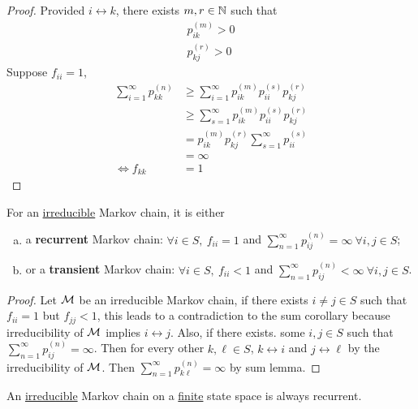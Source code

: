 \documentclass{article}
\newcommand{\upn}[0]{^{(n)}}
\begin{document}
    \begin{proof}
    	Provided $i \leftrightarrow k$, there exists $m, r \in \mathbb{N}$ such that 
    	\begin{align}
    		p_{ik}^{(m)} > 0 \\
    		p_{kj}^{(r)} > 0
    	\end{align}
    	Suppose $f_{ii} = 1$, 
    	\begin{align}
    		\sum_{i=1}^\infty p_{kk}\upn 
    		&\geq \sum_{i=1}^\infty p_{ik}^{(m)} p_{ii}^{(s)} p_{kj}^{(r)} \\
    		&\geq \sum_{s=1}^\infty p_{ik}^{(m)} p_{ii}^{(s)} p_{kj}^{(r)} \\
    		&= p_{ik}^{(m)} p_{kj}^{(r)} \sum_{s=1}^\infty p_{ii}^{(s)} \\
    		&= \infty \\
    		\iff f_{kk} &= 1
    	\end{align}
    \end{proof}
    
    \begin{theorem}
    	For an \ul{irreducible} Markov chain, it is either
    	\begin{enumerate}[(a)]
    		\item a \textbf{recurrent} Markov chain: $\forall i \in S,\ f_{ii} = 1$ and  $\sum_{n=1}^\infty p_{ij}\upn = \infty\ \forall i, j \in S$;
    		\item or a \textbf{transient} Markov chain: $\forall i \in S,\ f_{ii} < 1$ and $\sum_{n=1}^\infty p_{ij}\upn < \infty\ \forall i, j \in S$.
    	\end{enumerate}
    \end{theorem}
    
    \begin{proof}
    	Let $\mathcal{{M}}$ be an irreducible Markov chain, if there exists $i \neq j \in S$ such that $f_{ii} = 1$ but $f_{jj} < 1$, this leads to a contradiction to the sum corollary because irreducibility of $\mathcal{{M}}$ implies $i \leftrightarrow j$. Also, if there exists. some $i, j \in S$ such that $\sum_{n=1}^\infty p_{ij}\upn = \infty$. Then for every other $k, \ell \in S$, $k \leftrightarrow i$ and $j \leftrightarrow \ell$ by the irreducibility of $\mathcal{{M}}$. Then $\sum_{n=1}^\infty p_{k \ell}\upn = \infty$ by sum lemma.
    \end{proof}
    
    \begin{theorem}
    	An \ul{irreducible} Markov chain on a \ul{finite} state space is always recurrent.
    \end{theorem}
    
\end{document}

